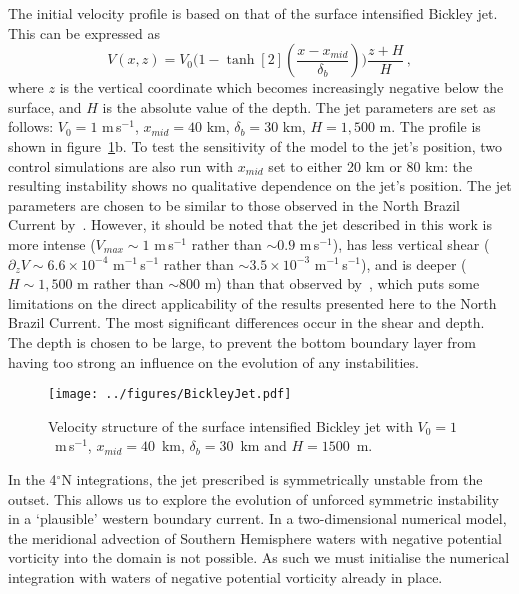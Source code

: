 The initial velocity profile is based on that of the surface intensified Bickley jet. This can be expressed as
\begin{equation}
    V(x, z) = V_0 \Bigg( 1 - \tanh[2](\frac{x - x_{mid}}{\delta_b})\Bigg) \frac{z + H}{H} \, ,
\end{equation}
where $z$ is the vertical coordinate which becomes increasingly negative below the surface, and $H$ is the absolute value of the depth. The jet parameters are set as follows: $V_0 = 1$ m\,s$^{-1}$, $x_{mid} = 40$ km, $\delta_b = 30$ km, $H = 1,500$ m. The profile is shown in figure~\ref{fig:SurfIntBickleyJet}b. To test the sensitivity of the model to the jet's position, two control simulations are also run with $x_{mid}$ set to either 20 km or 80 km: the resulting instability shows no qualitative dependence on the jet's position. The jet parameters are chosen to be similar to those observed in the North Brazil Current by~\citet{Johns1998}. However, it should be noted that the jet described in this work is more intense ($V_{max} \sim 1$ m\,s$^{-1}$ rather than $\sim 0.9$ m\,s$^{-1}$), has less vertical shear ($\partial_z V \sim 6.6\times 10^{-4}$ m$^{-1}$\,s$^{-1}$ rather than $\sim 3.5 \times 10^{-3}$ m$^{-1}$\,s$^{-1}$), and is deeper ($H\sim 1,500$ m rather than $\sim 800$ m) than that observed by~\citet{Johns1998}, which puts some limitations on the direct applicability of the results presented here to the North Brazil Current. The most significant differences occur in the shear and depth. The depth is chosen to be large, to prevent the bottom boundary layer from having too strong an influence on the evolution of any instabilities.

\begin{figure} 
    \centering
    \texttt{[image: ../figures/BickleyJet.pdf]}
    \caption{Velocity structure of the surface intensified Bickley jet with $V_0 = 1$~m$\,$s$^{-1}$, $x_{mid} = 40$~km, $\delta_b = 30$~km and $H = 1500$~m.}
    \label{fig:SurfIntBickleyJet}
\end{figure}

In the 4$^\circ$N integrations, the jet prescribed is symmetrically unstable from the outset. This allows us to explore the evolution of unforced symmetric instability in a `plausible' western boundary current. In a two-dimensional numerical model, the meridional advection of Southern Hemisphere waters with negative potential vorticity into the domain is not possible. As such we must initialise the numerical integration with waters of negative potential vorticity already in place.

